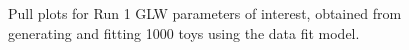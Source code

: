 \begin{figure}
\begin{tabular}{c}
  \end{tabular}
  \caption{Pull plots for Run 1 GLW parameters of interest, obtained from generating and fitting 1000 toys using the data fit model.}
\label{fig:GLW_run1_pulls}
\end{figure}
